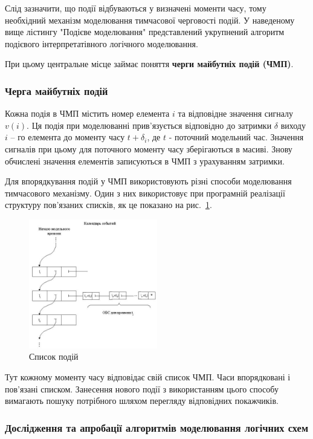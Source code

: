 \documentclass[12pt,a4paper]{article}
\begin{document}
Слід зазначити, що події відбуваються у визначені моменти часу, тому необхідний механізм моделювання тимчасової черговості подій. У наведеному вище лістингу "Подієве моделювання" представлений укрупнений алгоритм подієвого інтерпретатівного логічного моделювання.

При цьому центральне місце займає поняття \textbf{черги майбутніх подій (ЧМП)}.

\subsubsection{Черга майбутніх подій}

Кожна подія в ЧМП містить номер елемента $i$ та відповідне значення сигналу $v(i)$. Ця подія при моделюванні прив'язується відповідно до затримки $\delta$ виходу $i$ -- го елемента до моменту часу $t+\delta_i$, де $t$ - поточний модельний час. Значення сигналів при цьому для поточного моменту часу зберігаються в масиві. Знову обчислені значення елементів записуються в ЧМП з урахуванням затримки.

Для впорядкування подій у ЧМП використовують різні способи моделювання тимчасового механізму. Один з них використовує при програмній реалізації структуру пов'язаних списків, як це показано на рис.~\ref{feqCalendar}.

\begin{figure}[h]
  \centering
    \includegraphics[width=0.5\textwidth]{05_02.jpg}
  \caption{Список подій}\label{feqCalendar}
\end{figure}

Тут кожному моменту часу відповідає свій список ЧМП. Часи впорядковані і пов'язані списком. Занесення нового події з використанням цього способу вимагають пошуку потрібного шляхом перегляду відповідних покажчиків.

\subsubsection{Дослідження та апробації алгоритмів моделювання логічних схем}
\end{document}

